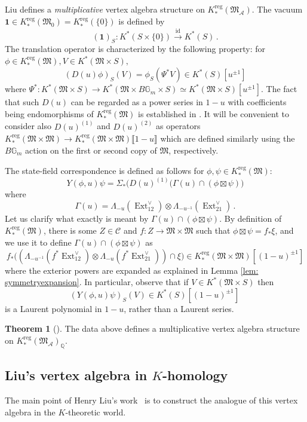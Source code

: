 \documentclass[12pt]{amsart}
\theoremstyle{definition}
\newtheorem{theorem}[definition]{Theorem}
\newcommand{\BG}{{\mathbb{G}}}
\newcommand{\BQ}{{\mathbb{Q}}}
\newcommand{\CA}{{\mathcal A}}
\newcommand{\CC}{{\mathcal C}}
\newcommand{\1}{\mathbf 1}
\newcommand{\FM}{{\mathfrak{M}}}
\newcommand{\reg}{\mathrm{reg}}
\begin{document}
Liu defines a \textit{multiplicative} vertex algebra structure on $K_\ast^\reg(\FM_{\mathcal A})$. The vacuum $\1\in K_\ast^\reg(\FM_0)=K_\ast^\reg(\{0\})$ is defined by 
\[(\1)_S: K^*(S \times \{0\}) \xrightarrow{\operatorname{id}} K^*(S)\,.\]
The translation operator is characterized by the following property: for $\phi \in K_\ast^\reg(\FM), V \in K^\ast(\FM \times S),$ 
\[(D(u)\phi)_S(V) = \phi_S(\Psi^\ast V)\in K^\ast(S)[u^{\pm 1}]\]
where $\Psi^\ast\colon K^\ast(\FM\times S)\to K^\ast(\FM\times B\BG_m\times S)\simeq K^\ast(\FM\times S)[u^{\pm 1}]$. The fact that such $D(u)$ can be regarded as a power series in $1-u$ with coefficients being endomorphisms of $K_\ast^\reg(\FM)$ is established in \cite[Lemma 3.3.7]{Liu}. It will be convenient to consider also $D(u)^{(1)}$ and $D(u)^{(2)}$ as operators $K_\ast^\reg(\FM\times \FM)\to K_\ast^\reg(\FM\times \FM)\llbracket 1-u\rrbracket$ which are defined similarly  using the $B\BG_m$ action on the first or second copy of $\FM$, respectively.

The state-field correspondence is defined as follows for 
$\phi, \psi \in K_*^\reg(\FM)$:
\[Y(\phi, u)\psi = \Sigma_*\big(D(u)^{(1)}(\Gamma(u)\cap (\phi \boxtimes \psi)\big)\] where
\[\Gamma(u) = \Lambda_{-u}(\operatorname{Ext}_{12}^{\vee}) \otimes \Lambda_{-u^{-1}}(\operatorname{Ext}_{21}^{\vee})\,.\]
Let us clarify what exactly is meant by $\Gamma(u)\cap (\phi \boxtimes \psi)$. By definition of $K_*^\reg(\FM)$, there is some $Z\in \CC$ and $f\colon Z\to \FM\times \FM$ such that $\phi\boxtimes \psi=f_\ast \xi$, and we use it to define $\Gamma(u)\cap (\phi \boxtimes \psi)$ as
\[f_\ast\big((\Lambda_{-u^{-1}}(f^\ast\operatorname{Ext}_{12}^{\vee}) \otimes \Lambda_{-u}(f^\ast\operatorname{Ext}_{21}^{\vee}))\cap \xi\big)\in K_\ast^\reg(\FM\times \FM)[(1-u)^{\pm 1}]\]
where the exterior powers are expanded as explained in Lemma \ref{lem: symmetryexpansion}. In particular, observe that if $V\in K^\ast(\FM\times S)$ then 
\[(Y(\phi, u)\psi)_S(V)\in K^\ast(S)[(1-u)^{\pm 1}]\,\]
is a Laurent polynomial in $1-u$, rather than a Laurent series. 



\begin{theorem}[{\cite{Liu}}]
The data above defines a multiplicative vertex algebra structure on $K_\ast^\reg(\FM_{\CA})_\BQ$.
\end{theorem}

\iffalse
\subsection{Liu's vertex algebra in $K$-homology}
The main point of Henry Liu's work~\cite{liu} is to construct the analogue of this vertex algebra in the $K$-theoretic world.
\end{document}
